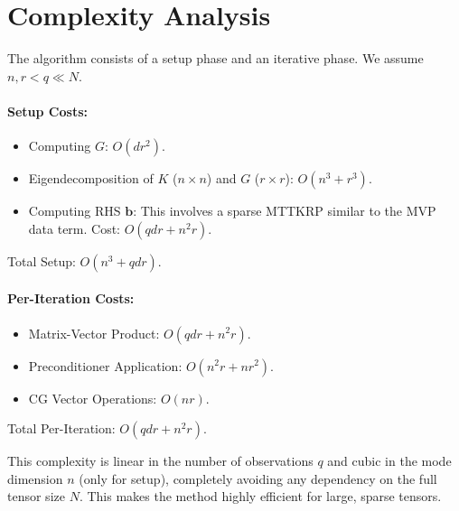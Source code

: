 \documentclass[11pt]{article}
\begin{document}
\section{Complexity Analysis}

The algorithm consists of a setup phase and an iterative phase. We assume $n, r < q \ll N$.

\paragraph{Setup Costs:}
\begin{itemize}
    \item Computing $G$: $O(d r^2)$.
    \item Eigendecomposition of $K$ ($n \times n$) and $G$ ($r \times r$): $O(n^3 + r^3)$.
    \item Computing RHS $\mathbf{b}$: This involves a sparse MTTKRP similar to the MVP data term. Cost: $O(qdr + n^2 r)$.
\end{itemize}
Total Setup: $O(n^3 + qdr)$.

\paragraph{Per-Iteration Costs:}
\begin{itemize}
    \item Matrix-Vector Product: $O(qdr + n^2 r)$.
    \item Preconditioner Application: $O(n^2 r + nr^2)$.
    \item CG Vector Operations: $O(nr)$.
\end{itemize}
Total Per-Iteration: $O(qdr + n^2 r)$.

This complexity is linear in the number of observations $q$ and cubic in the mode dimension $n$ (only for setup), completely avoiding any dependency on the full tensor size $N$. This makes the method highly efficient for large, sparse tensors.
\end{document}
